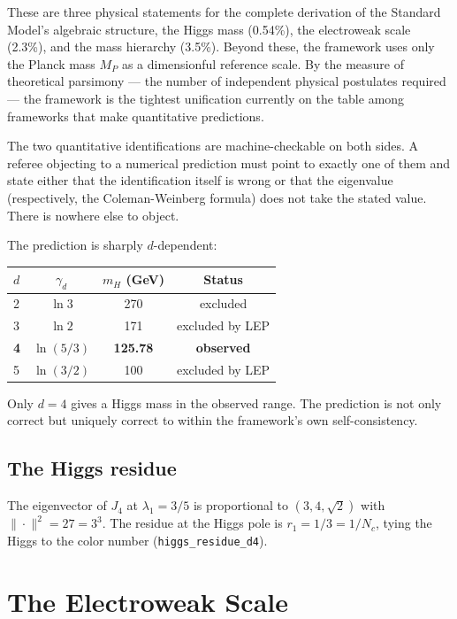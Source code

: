 \documentclass[11pt,letterpaper]{article}
\theoremstyle{remark}
\newcommand{\lean}[1]{\texttt{\small #1}}
\begin{document}
These are three physical statements for the complete derivation of
the Standard Model's algebraic structure, the Higgs mass (0.54\%),
the electroweak scale (2.3\%), and the mass hierarchy (3.5\%).
Beyond these, the framework uses only the Planck mass $M_P$ as a
dimensionful reference scale. By the measure of theoretical parsimony
— the number of independent physical postulates required — the
framework is the tightest unification currently on the table among
frameworks that make quantitative predictions.

The two quantitative identifications are machine-checkable on both
sides. A referee objecting to a numerical prediction must point to
exactly one of them and state either that the identification itself
is wrong or that the eigenvalue (respectively, the Coleman-Weinberg
formula) does not take the stated value. There is nowhere else to
object.

\noindent The prediction is sharply $d$-dependent:

\begin{center}
\begin{tabular}{@{}lccc@{}}
\toprule
$d$ & $\gamma_d$ & $m_H$ (GeV) & Status \\
\midrule
2 & $\ln 3$ & 270 & excluded \\
3 & $\ln 2$ & 171 & excluded by LEP \\
\textbf{4} & \textbf{$\ln(5/3)$} & \textbf{125.78} & \textbf{observed} \\
5 & $\ln(3/2)$ & 100 & excluded by LEP \\
\bottomrule
\end{tabular}
\end{center}

\noindent Only $d = 4$ gives a Higgs mass in the observed range. The
prediction is not only correct but uniquely correct to within the
framework's own self-consistency.

\subsection{The Higgs residue}

The eigenvector of $J_4$ at $\lambda_1 = 3/5$ is proportional to
$(3, 4, \sqrt{2})$ with $\|\cdot\|^2 = 27 = 3^3$. The residue at
the Higgs pole is $r_1 = 1/3 = 1/N_c$, tying the Higgs to the color
number (\lean{higgs\_residue\_d4}).

\section{The Electroweak Scale}
\label{sec:ewscale}
\end{document}
